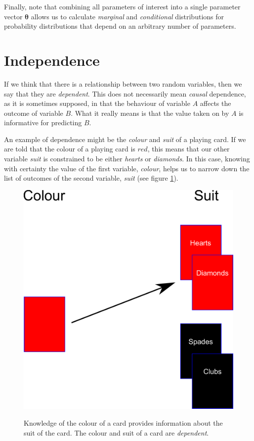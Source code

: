 \documentclass[11pt,fullpage]{book}
\begin{document}
Finally, note that combining all parameters of interest into a single parameter vector $\boldsymbol{\theta}$ allows us to calculate \textit{marginal} and \textit{conditional} distributions for probability distributions that depend on an arbitrary number of parameters.

\section{Independence}\label{sec:Intro_independence}
If we think that there is a relationship between two random variables, then we say that they are \textit{dependent}. This does not necessarily mean \textit{causal} dependence, as it is sometimes supposed, in that the behaviour of variable $A$ affects the outcome of variable $B$. What it really means is that the value taken on by $A$ is informative for predicting $B$. 

An example of dependence might be the \textit{colour} and \textit{suit} of a playing card. If we are told that the colour of a playing card is $red$, this means that our other variable \textit{suit} is constrained to be either \textit{hearts} or \textit{diamonds}. In this case, knowing with certainty the value of the first variable, \textit{colour}, helps us to narrow down the list of outcomes of the second variable, \textit{suit} (see figure \ref{fig:Intro_IndependenceCards}).

\begin{figure}
\centering
\scalebox{0.3} 
{\includegraphics{Intro_IndependenceCards.pdf}}
\caption{Knowledge of the colour of a card provides information about the suit of the card. The colour and suit of a card are \textit{dependent}.}\label{fig:Intro_IndependenceCards}
\end{figure}
\end{document}

